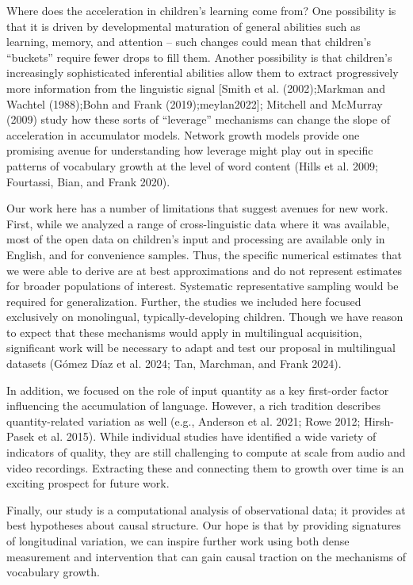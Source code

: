 \documentclass[
  11pt,
]{article}
\begin{document}
Where does the acceleration in children's learning come from? One
possibility is that it is driven by developmental maturation of general
abilities such as learning, memory, and attention -- such changes could
mean that children's ``buckets'' require fewer drops to fill them.
Another possibility is that children's increasingly sophisticated
inferential abilities allow them to extract progressively more
information from the linguistic signal {[}Smith et al. (2002);Markman
and Wachtel (1988);Bohn and Frank (2019);meylan2022{]}; Mitchell and
McMurray (2009) study how these sorts of ``leverage'' mechanisms can
change the slope of acceleration in accumulator models. Network growth
models provide one promising avenue for understanding how leverage might
play out in specific patterns of vocabulary growth at the level of word
content (Hills et al. 2009; Fourtassi, Bian, and Frank 2020).

Our work here has a number of limitations that suggest avenues for new
work. First, while we analyzed a range of cross-linguistic data where it
was available, most of the open data on children's input and processing
are available only in English, and for convenience samples. Thus, the
specific numerical estimates that we were able to derive are at best
approximations and do not represent estimates for broader populations of
interest. Systematic representative sampling would be required for
generalization. Further, the studies we included here focused
exclusively on monolingual, typically-developing children. Though we
have reason to expect that these mechanisms would apply in multilingual
acquisition, significant work will be necessary to adapt and test our
proposal in multilingual datasets (Gómez Díaz et al. 2024; Tan,
Marchman, and Frank 2024).

In addition, we focused on the role of input quantity as a key
first-order factor influencing the accumulation of language. However, a
rich tradition describes quantity-related variation as well (e.g.,
Anderson et al. 2021; Rowe 2012; Hirsh-Pasek et al. 2015). While
individual studies have identified a wide variety of indicators of
quality, they are still challenging to compute at scale from audio and
video recordings. Extracting these and connecting them to growth over
time is an exciting prospect for future work.

Finally, our study is a computational analysis of observational data; it
provides at best hypotheses about causal structure. Our hope is that by
providing signatures of longitudinal variation, we can inspire further
work using both dense measurement and intervention that can gain causal
traction on the mechanisms of vocabulary growth.
\end{document}
